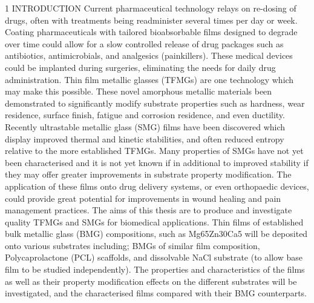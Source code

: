 1	INTRODUCTION 
Current pharmaceutical technology relays on re-dosing of drugs, often with treatments being readminister several times per day or week. Coating pharmaceuticals with tailored bioabsorbable films designed to degrade over time could allow for a slow controlled release of drug packages such as antibiotics, antimicrobials, and analgesics (painkillers). These medical devices could be implanted during surgeries, eliminating the needs for daily drug administration.  
Thin film metallic glasses (TFMGs) are one technology which may make this possible. These novel amorphous metallic materials been demonstrated to significantly modify substrate properties such as hardness, wear residence, surface finish, fatigue and corrosion residence, and even ductility. Recently ultrastable metallic glass (SMG) films have been discovered which display improved thermal and kinetic stabilities, and often reduced entropy relative to the more established TFMGs. Many properties of SMGs have not yet been characterised and it is not yet known if in additional to improved stability if they may offer greater improvements in substrate property modification. The application of these films onto drug delivery systems, or even orthopaedic devices, could provide great potential for improvements in wound healing and pain management practices.
The aims of this thesis are to produce and investigate quality TFMGs and SMGs for biomedical applications. Thin films of established bulk metallic glass (BMG) compositions, such as Mg65Zn30Ca5 will be deposited onto various substrates including; BMGs of similar film composition, Polycaprolactone (PCL) scaffolds, and dissolvable NaCl substrate (to allow base film to be studied independently). The properties and characteristics of the films as well as their property modification effects on the different substrates will be investigated, and the characterised films compared with their BMG counterparts. 
